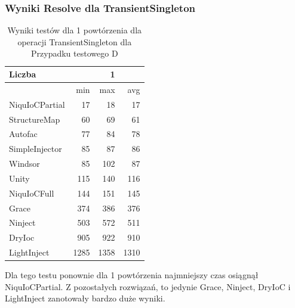 \documentclass[12pt]{article}
\begin{document}
\subsubsection{Wyniki Resolve dla TransientSingleton}
\begin{table}[H]
\captionsetup{belowskip=0pt,aboveskip=0pt}
\begin{center}
\begin{small}
	\begin{tabular}{ | l | r r r | }
    		\hline
Liczba & & 1 & \\ \hline
 & min & max & avg \\ \hline
NiquIoCPartial & 17 & 18 & 17 \\ \hline
StructureMap & 60 & 69 & 61 \\ \hline
Autofac & 77 & 84 & 78 \\ \hline
SimpleInjector & 85 & 87 & 86 \\ \hline
Windsor & 85 & 102 & 87 \\ \hline
Unity & 115 & 140 & 116 \\ \hline
NiquIoCFull & 144 & 151 & 145 \\ \hline
Grace & 374 & 386 & 376 \\ \hline
Ninject & 503 & 572 & 511 \\ \hline
DryIoc & 905 & 922 & 910 \\ \hline
LightInject & 1285 & 1358 & 1310 \\ \hline
  	\end{tabular}
\end{small}
\end{center}
\caption{Wyniki testów dla 1 powtórzenia dla operacji TransientSingleton dla Przypadku testowego D}
\label{TestCaseD_TransientSingleton}
\end{table}
Dla tego testu ponownie dla 1 powtórzenia najmniejszy czas osiągnął NiquIoCPartial. Z pozostałych rozwiązań, to jedynie Grace, Ninject, DryIoC i LightInject zanotowały bardzo duże wyniki.
\\ \\
\end{document}
